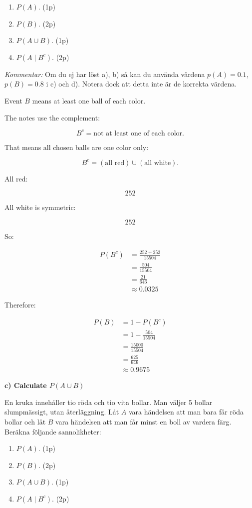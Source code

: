 \documentclass[10pt]{article}
\begin{document}
\begin{enumerate}[label=\alph*)]
\item $P(A)$. \hfill (1p)
\item $P(B)$. \hfill (2p)
\item $P(A\cup B)$. \hfill (1p)
\item $P(A\mid B^c)$. \hfill (2p)
\end{enumerate}

\textit{Kommentar:}
Om du ej har löst a), b) så kan du använda värdena
$p(A)=0.1$, $p(B)=0.8$ i c) och d).
Notera dock att detta inte är de korrekta värdena.

Event $B$ means at least one ball of each color.

The notes use the complement:

\[
B^c=\text{not at least one of each color}.
\]

That means all chosen balls are one color only:

\[
B^c=(\text{all red})\cup(\text{all white}).
\]

All red:

\[
252
\]

All white is symmetric:

\[
252
\]

So:

\begin{align*}
P(B^c)
&=
\frac{252+252}{15504} \\[2mm]
&=
\frac{504}{15504} \\[2mm]
&=
\frac{21}{646} \\[2mm]
&\approx 0.0325
\end{align*}

Therefore:

\begin{align*}
P(B)
&=
1-P(B^c) \\[2mm]
&=
1-\frac{504}{15504} \\[2mm]
&=
\frac{15000}{15504} \\[2mm]
&=
\frac{625}{646} \\[2mm]
&\approx 0.9675
\end{align*}

\textbf{c) Calculate $P(A\cup B)$}

En kruka innehåller tio röda och tio vita bollar.
Man väljer 5 bollar slumpmässigt, utan återläggning.
Låt $A$ vara händelsen att man bara får röda bollar och låt
$B$ vara händelsen att man får minst en boll av vardera färg.
Beräkna följande sannolikheter:

\begin{enumerate}[label=\alph*)]
\item $P(A)$. \hfill (1p)
\item $P(B)$. \hfill (2p)
\item $P(A\cup B)$. \hfill (1p)
\item $P(A\mid B^c)$. \hfill (2p)
\end{enumerate}
\end{document}
